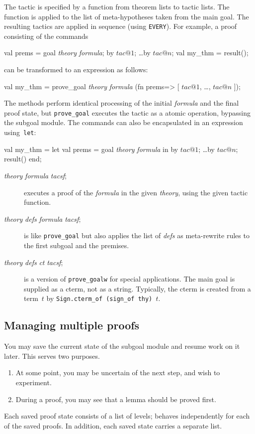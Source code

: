 The tactic is specified by a function from theorem lists to tactic lists.
The function is applied to the list of meta-hypotheses taken from the main
goal.  The resulting tactics are applied in sequence (using {\tt EVERY}).
For example, a proof consisting of the commands
\begin{ttbox} 
val prems = goal {\it theory} {\it formula};
by \(tac@1\);  \ldots  by \(tac@n\);
val my_thm = result();
\end{ttbox}
can be transformed to an expression as follows:
\begin{ttbox} 
val my_thm = prove_goal {\it theory} {\it formula}
 (fn prems=> [ \(tac@1\), \ldots, \(tac@n\) ]);
\end{ttbox}
The methods perform identical processing of the initial {\it formula} and
the final proof state, but {\tt prove_goal} executes the tactic as a
atomic operation, bypassing the subgoal module.  The commands can also be
encapsulated in an expression using~{\tt let}:
\begin{ttbox} 
val my_thm = 
    let val prems = goal {\it theory} {\it formula}
    in  by \(tac@1\);  \ldots  by \(tac@n\);  result() end;
\end{ttbox}

\begin{description}
\item[ {\it theory} {\it formula} {\it tacsf}; ] 
executes a proof of the {\it formula\/} in the given {\it theory}, using
the given tactic function.

\item[ {\it theory} {\it defs} {\it formula} 
      {\it tacsf}; ]
is like {\tt prove_goal} but also applies the list of {\it defs\/} as
meta-rewrite rules to the first subgoal and the premises.

\item[ {\it theory} {\it defs} {\it ct}
      {\it tacsf}; ] 
is a version of {\tt prove_goalw} for special applications.  The main
goal is supplied as a cterm, not as a string.  Typically, the cterm is
created from a term~$t$ by \hbox{\tt Sign.cterm_of (sign_of thy) $t$}.
\end{description}


\subsection{Managing multiple proofs}
You may save the current state of the subgoal module and resume work on it
later.  This serves two purposes.  
\begin{enumerate}
\item At some point, you may be uncertain of the next step, and
wish to experiment.

\item During a proof, you may see that a lemma should be proved first.
\end{enumerate}
Each saved proof state consists of a list of levels;  behaves
independently for each of the saved proofs.  In addition, each saved state
carries a separate  list.

